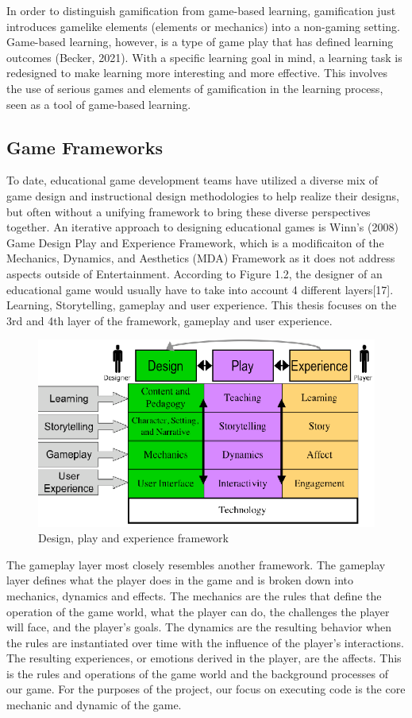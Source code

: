 In order to distinguish gamification from game-based learning, gamification just introduces gamelike elements (elements or mechanics) into a non-gaming setting. Game-based learning, however, is a type of game play that has defined learning outcomes (Becker, 2021). With a specific learning goal in mind, a learning task is redesigned to make learning more interesting and more effective. This involves the use of serious games and elements of gamification in the learning process, seen as a tool of game-based learning. 

\subsection{Game Frameworks}
To date, educational game development teams have utilized a diverse mix of game design and instructional design methodologies to help realize their designs, but often without a unifying framework to bring these diverse perspectives together. An iterative approach to designing educational games is Winn's (2008) Game Design Play and Experience Framework, which is a modificaiton of the Mechanics, Dynamics, and Aesthetics (MDA) Framework as it does not address aspects outside of Entertainment. According to Figure 1.2, the designer of an educational game would usually have to take into account 4 different layers[17]. Learning, Storytelling, gameplay and user experience. This thesis focuses on the 3rd and 4th layer of the framework, gameplay and user experience.

\begin{figure}[H]
    \centering
    \includegraphics[width=0.5\linewidth]{images/dpe framework.png}
    \caption{Design, play and experience framework}
\end{figure}


The gameplay layer most closely resembles another framework. The gameplay layer defines what the player does in the game and is broken down into mechanics, dynamics and effects. The mechanics are the rules that define the operation of the game world, what the player can do, the challenges the player will face, and the player’s goals. The dynamics are the resulting behavior when the rules are instantiated over time with the influence of the
player’s interactions. The resulting experiences, or emotions derived in the player, are the affects. This is the rules and operations of the game world and the background processes of our game. For the purposes of the project, our focus on executing code is the core mechanic and dynamic of the game.

